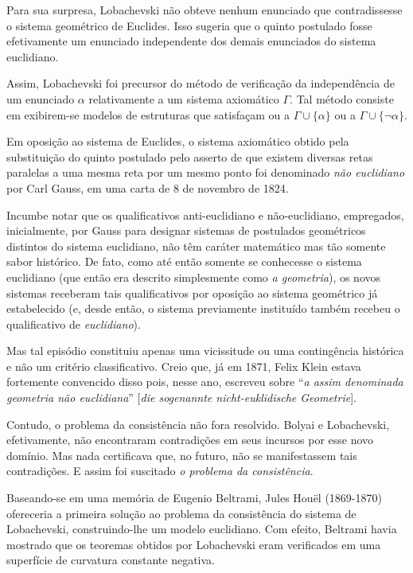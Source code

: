 \documentclass{hipatia}
\begin{document}
Para sua surpresa, Lobachevski não obteve nenhum enunciado que contradissesse o sistema geométrico de Euclides. Isso sugeria que o quinto postulado fosse efetivamente um enunciado independente dos demais enunciados do sistema euclidiano. 

Assim, Lobachevski foi precursor do método de verificação da independência de um enunciado $\alpha$ relativamente a um sistema axiomático $\Gamma$. Tal método consiste em exibirem-se modelos de estruturas que satisfaçam ou a $\Gamma\cup\{\alpha\}$ ou a $\Gamma\cup\{\neg\alpha\}$. 


Em oposição ao sistema de Euclides, o sistema axiomático obtido pela substituição do quinto postulado pelo asserto de que existem diversas retas paralelas a uma mesma reta por um mesmo ponto foi denominado \emph{não euclidiano} por Carl Gauss, em uma carta de 8 de novembro de 1824.  \cite[p. 39]{barbosa1995} 

Incumbe notar que os qualificativos anti-euclidiano e não-euclidiano, empregados, inicialmente, por Gauss para designar sistemas de postulados geométricos distintos do sistema euclidiano, não têm caráter matemático mas tão somente sabor histórico. De fato, como até então somente se conhecesse o sistema euclidiano  (que então era descrito simplesmente como \emph{a geometria}), os novos sistemas receberam tais qualificativos por oposição ao sistema geométrico já estabelecido (e, desde então, o sistema previamente instituído também recebeu o qualificativo de \emph{euclidiano}). 

Mas tal episódio constituiu apenas uma vicissitude ou uma contingência histórica e não um critério classificativo. Creio que, já em 1871, Felix Klein estava fortemente convencido disso pois, nesse ano, escreveu sobre ``\emph{a assim denominada geometria não euclidiana}'' [\emph{die sogenannte nicht-euklidische Geometrie}].  \cite[p. 67]{bonola1906}\cite[p. 214]{yaglom}  

Contudo, o problema da consistência não fora resolvido. Bolyai e Lobachevski, efetivamente, não encontraram contradições em seus incursos por esse novo domínio. Mas nada certificava que, no futuro, não se manifestassem tais contradições. E assim foi suscitado \emph{o problema da consistência}.  \cite[p.  388]{kneale}  

Baseando-se em uma memória de Eugenio Beltrami, Jules Houël (1869-1870) ofereceria a primeira solução ao problema da consistência do sistema de Lobachevski, construindo-lhe um modelo euclidiano. Com efeito, Beltrami havia mostrado que os teoremas obtidos por Lobachevski eram verificados em uma superfície de curvatura constante negativa.  \cite[p. 320--321]{kagan1986}\cite[p. 32--33]{carmo1988}  
\end{document}
